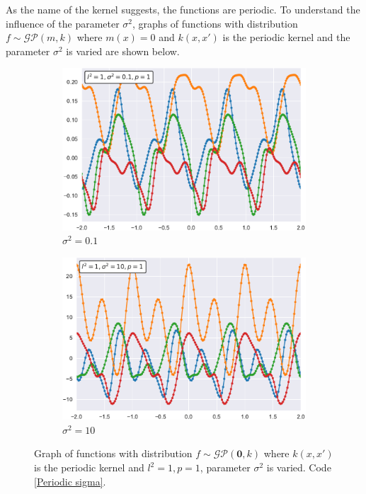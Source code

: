 As the name of the kernel suggests, the functions are periodic.
To understand the influence of the parameter $\sigma^2$, graphs of functions with distribution $f\sim \mathcal{GP}(m,k)$ where $m(x)=0$ and $k(x,x')$ is the periodic kernel and the parameter $\sigma^2$ is varied are shown below.

\begin{figure}[h]
\centering
\begin{subfigure}{.5\textwidth}
  \centering
  \includegraphics[width=\linewidth]{images/Gaussian process/Periodic - sigma=01.pdf}
  \caption{$\sigma^2=0.1$}
\end{subfigure}%
\begin{subfigure}{.5\textwidth}
  \centering
  \includegraphics[width=\linewidth]{images/Gaussian process/Periodic - sigma=10.pdf}
  \caption{$\sigma^2=10$}
\end{subfigure}
\caption{Graph of functions with distribution  $f\sim \mathcal{GP}(\bm{0},k)$ where $k(x,x')$ is the periodic kernel and $l^2=1, p=1$, parameter $\sigma^2$ is varied. Code \ref{Periodic sigma}.}
\label{10 sample periodic modified sigma}
\end{figure}

